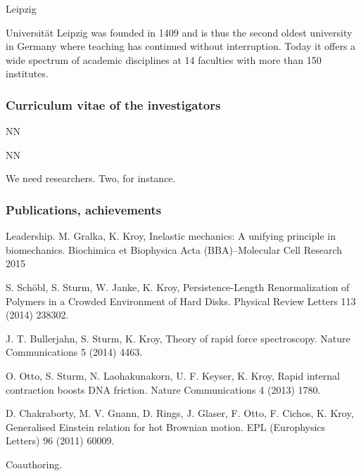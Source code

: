 \begin{sitedescription}{Leipzig} \label{desc:Leipzig}

Universität Leipzig was founded in 1409 and is thus the second oldest university in Germany
where teaching has continued without interruption. Today it offers a wide spectrum of
academic disciplines at 14 faculties with more than 150 institutes.

\subsubsection*{Curriculum vitae of the investigators}



\begin{participant}[type=res,PM=48,salary=5500]{NN}
\end{participant}
\begin{participant}[type=res,PM=36,salary=5500]{NN}

We need researchers. Two, for instance.

\end{participant}

\subsubsection*{Publications, achievements}

\begin{compactenum}
\item Leadership.
M. Gralka, K. Kroy, Inelastic mechanics: A unifying principle in biomechanics. 
Biochimica et Biophysica Acta (BBA)--Molecular Cell Research 2015

S. Schöbl, S. Sturm, W. Janke, K. Kroy, Persistence-Length Renormalization of Polymers in a Crowded Environment of Hard Disks.
Physical Review Letters 113 (2014) 238302.

J. T. Bullerjahn, S. Sturm, K. Kroy, Theory of rapid force spectroscopy. Nature Communications 5 (2014) 4463.

O. Otto, S. Sturm, N. Laohakunakorn, U. F. Keyser, K. Kroy, Rapid internal contraction boosts DNA friction.
Nature Communications 4 (2013) 1780.

D. Chakraborty, M. V. Gnann, D. Rings, J. Glaser, F. Otto, F. Cichos, K. Kroy, 
Generalised Einstein relation for hot Brownian motion. EPL (Europhysics Letters) 96 (2011) 60009.

\item Coauthoring.
\end{compactenum}


\end{sitedescription}
